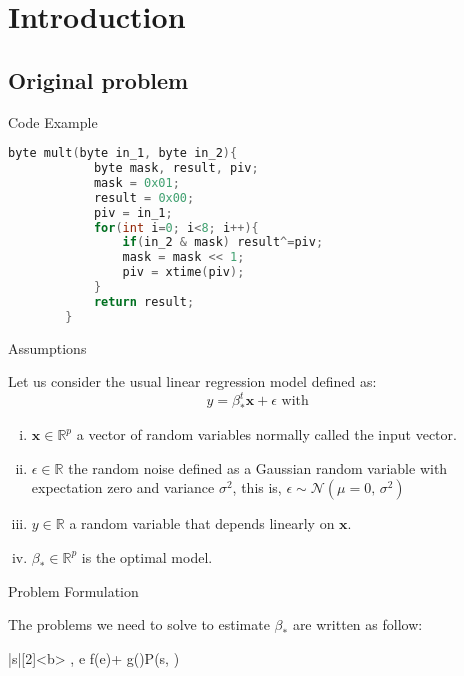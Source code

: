 

\section{Introduction}

\subsection{Original problem}

\begin{frame}[t]{Code Example}
	\begin{lstlisting}[language=C++, caption=Multiplication example]
		byte mult(byte in_1, byte in_2){
			byte mask, result, piv;
			mask = 0x01;
			result = 0x00;
			piv = in_1;	
			for(int i=0; i<8; i++){
				if(in_2 & mask) result^=piv;
				mask = mask << 1;
				piv = xtime(piv);
			}
			return result;
		}
	\end{lstlisting}
\end{frame}

\begin{frame}[t]{Assumptions}

	Let us consider the usual linear regression model defined as: \[y = \beta_*^t \mathbf{x} + \epsilon \text{ with }\]
	
	\begin{enumerate}[i.]
		\item $\mathbf{x} \in \mathbb{R}^p$ a vector of random variables normally called the input vector.
		\item $\epsilon \in \mathbb{R}$ the random noise defined as a Gaussian random variable with expectation zero and variance $\sigma^2$, this is, $\epsilon \sim \mathcal{N}(\mu=0,\,\sigma^{2})$
		\item $y \in \mathbb{R}$ a random variable that depends linearly on $\mathbf{x}$.
		\item $\beta_* \in \mathbb{R}^p$ is the optimal model.
	\end{enumerate} 

\end{frame}

\begin{frame}[t]{Problem Formulation}
	
	The problems we need to solve to estimate $\beta_*$ are written as follow:
	
	\begin{mini!}|s|[2]<b>
		{\beta, e}{ f(e)+ \lambda g(\beta)}{}{P(s, \lambda) \quad}
	\end{mini!}

\end{frame}

